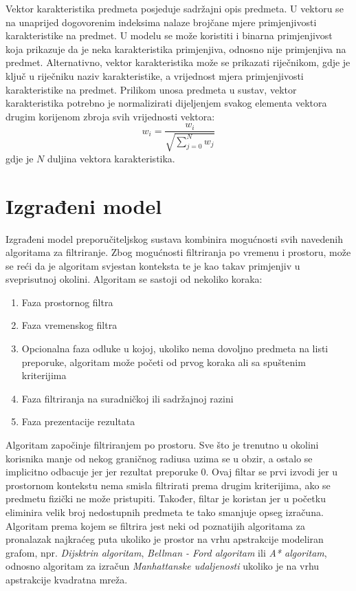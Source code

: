 \documentclass[times, utf8, diplomski, numeric]{fer}
\begin{document}
Vektor karakteristika predmeta posjeduje sadržajni opis predmeta. U vektoru se
na unaprijed dogovorenim indeksima nalaze brojčane mjere primjenjivosti
karakteristike na predmet. U modelu se može koristiti i binarna primjenjivost
koja prikazuje da je neka karakteristika primjenjiva, odnosno nije primjenjiva
na predmet. Alternativno, vektor karakteristika može se prikazati riječnikom,
gdje je ključ u riječniku naziv karakteristike, a vrijednost mjera
primjenjivosti karakteristike na predmet. 
Prilikom unosa predmeta u sustav, vektor karakteristika potrebno je
normalizirati dijeljenjem svakog elementa vektora drugim korijenom zbroja svih
vrijednosti vektora:
\begin{equation}
	\label{eq:norm}
	w_i = \frac
	{
		w_i
	}
	{
		\sqrt{\sum_{j=0}^N w_j}
	}
\end{equation}
gdje je $N$ duljina vektora karakteristika.
\section{Izgrađeni model}

Izgrađeni model preporučiteljskog sustava kombinira mogućnosti svih navedenih
algoritama za filtriranje. Zbog mogućnosti filtriranja po vremenu i prostoru,
može se reći da je algoritam svjestan konteksta te je kao takav primjenjiv u
sveprisutnoj okolini. Algoritam se sastoji od nekoliko koraka:
\begin{enumerate}
  \item Faza prostornog filtra
  \item Faza vremenskog filtra
  \item Opcionalna faza odluke u kojoj, ukoliko nema dovoljno predmeta na listi
  preporuke, algoritam može početi od prvog koraka ali sa spuštenim kriterijima
  \item Faza filtriranja na suradničkoj ili sadržajnoj razini
  \item Faza prezentacije rezultata
\end{enumerate}

Algoritam započinje filtriranjem po prostoru. Sve što je trenutno u okolini
korisnika manje od nekog graničnog radiusa uzima se u obzir, a ostalo se
implicitno odbacuje jer jer rezultat preporuke $0$. Ovaj filtar se prvi izvodi
jer u prostornom kontekstu nema smisla filtrirati prema drugim kriterijima, ako
se predmetu fizički ne može pristupiti. Također, filtar je koristan jer u
početku eliminira velik broj nedostupnih predmeta te tako smanjuje opseg
izračuna. Algoritam prema kojem se filtrira jest neki od poznatijih algoritama
za pronalazak najkraćeg puta ukoliko je prostor na vrhu apstrakcije modeliran
grafom, npr. \emph{Dijsktrin algoritam}, \emph{Bellman - Ford algoritam} ili
\emph{A* algoritam}, odnosno algoritam za izračun \emph{Manhattanske
udaljenosti} ukoliko je na vrhu apstrakcije kvadratna mreža.
\end{document}
